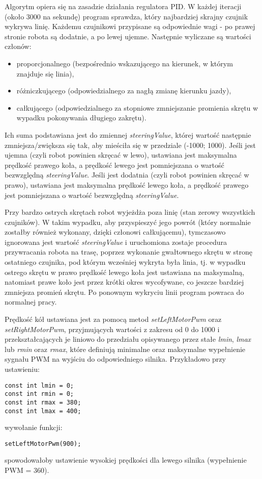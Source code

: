 Algorytm opiera się na zasadzie działania regulatora PID. W każdej iteracji (około 3000 na sekundę) program sprawdza, który najbardziej skrajny czujnik wykrywa linię. Każdemu czujnikowi przypisane są odpowiednie wagi - po prawej stronie robota są dodatnie, a po lewej ujemne.
Następnie wyliczane są wartości członów: 
\begin{itemize}
\item proporcjonalnego (bezpośrednio wskazującego na kierunek, w którym znajduje się linia),
\item różniczkującego (odpowiedzialnego za nagłą zmianę kierunku jazdy),
\item całkującego (odpowiedzialnego za stopniowe zmniejszanie promienia skrętu w wypadku pokonywania długiego zakrętu).
\end{itemize}

Ich suma podstawiana jest do zmiennej \emph{steeringValue},  której wartość następnie zmniejsza/zwiększa się tak, aby mieściła się w przedziale (-1000; 1000).
Jeśli jest ujemna (czyli robot powinien skręcać w lewo), ustawiana jest maksymalna prędkość prawego koła, a prędkość lewego jest pomniejszana o wartość bezwzględną \emph{steeringValue}. 
Jeśli jest dodatnia (czyli robot powinien skręcać w prawo), ustawiana jest maksymalna prędkość lewego koła, a prędkość prawego jest pomniejszana o wartość bezwzględną \emph{steeringValue}.

Przy bardzo ostrych skrętach robot wyjeżdża poza linię (stan zerowy wszystkich czujników). W takim wypadku, aby przyspieszyć jego powrót (który normalnie zostałby również wykonany, dzięki członowi całkującemu), tymczasowo ignorowana jest wartość \emph{steeringValue} i uruchomiona zostaje procedura przywracania robota na trasę, poprzez wykonanie gwałtownego skrętu w stronę ostatniego czujnika, pod którym wcześniej wykryta była linia, tj. w wypadku ostrego skrętu w prawo prędkość lewego koła jest ustawiana na maksymalną, natomiast prawe koło jest przez krótki okres wycofywane, co jeszcze bardziej zmniejsza promień skrętu. Po ponownym wykryciu linii program powraca do normalnej pracy.

Prędkość kół ustawiana jest za pomocą metod \emph{setLeftMotorPwm} oraz \emph{setRightMotorPwm}, przyjmujących wartości z zakresu od 0 do 1000 i przekształcających je liniowo do przedziału opisywanego przez stałe \emph{lmin}, \emph{lmax} lub \emph{rmin} oraz \emph{rmax}, które definiują minimalne oraz maksymalne wypełnienie sygnału PWM na wyjściu do odpowiedniego silnika. Przykładowo przy ustawieniu:

\begin{lstlisting}
const int lmin = 0;
const int rmin = 0;
const int rmax = 380;
const int lmax = 400;
\end{lstlisting}
wywołanie funkcji:
\begin{lstlisting}
setLeftMotorPwm(900);
\end{lstlisting}
spowodowałoby ustawienie wysokiej prędkości dla lewego silnika (wypełnienie PWM = 360).

